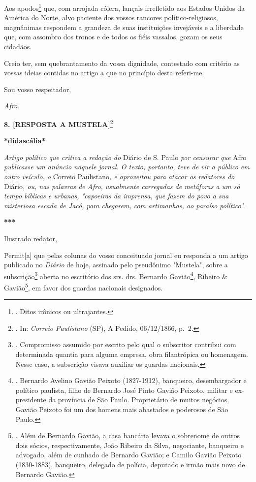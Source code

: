 Aos apodos\footnote{. Ditos irônicos ou ultrajantes.} que, com arrojada
cólera, lançais irrefletido aos Estados Unidos da América do Norte, alvo
paciente dos vossos rancores político-religiosos, magnânimas respondem a
grandeza de suas instituições invejáveis e a liberdade que, com assombro
dos tronos e de todos os fiéis vassalos, gozam os seus cidadãos.

Creio ter, sem quebrantamento da vossa dignidade, contestado com
critério as vossas ideias contidas no artigo a que no princípio desta
referi-me.

Sou vosso respeitador,

\emph{Afro}.

\textbf{8. {[}RESPOSTA A MUSTELA{]}}\footnote{. In: \emph{Correio
  Paulistano} (SP), A Pedido, 06/12/1866, p.~2.}

\textbf{*didascália*}

\emph{Artigo político que critica a redação do} Diário de S. Paulo
\emph{por censurar que} Afro \emph{publicasse um anúncio naquele jornal.
O texto, portanto, teve de vir a público em outro veículo, o} Correio
Paulistano\emph{, e aproveitou para atacar os redatores do}
Diário\emph{, ou, nas palavras de Afro, usualmente carregadas de
metáforas a um só tempo bíblicas e urbanas, "capoeiras da imprensa, que
fazem do povo a sua misteriosa escada de Jacó, para chegarem, com
artimanhas, ao paraíso político".}

\textbf{***}

Ilustrado redator,

Permit{[}a{]} que pelas colunas do vosso conceituado jornal eu responda
a um artigo publicado no \emph{Diário} de hoje, assinado pelo pseudônimo
"Mustela", sobre a subscrição\footnote{. Compromisso assumido por
  escrito pelo qual o subscritor contribui com determinada quantia para
  alguma empresa, obra filantrópica ou homenagem. Nesse caso, a
  subscrição visava auxiliar os guardas nacionais.} aberta no escritório
dos srs. drs. Bernardo Gavião\footnote{. Bernardo Avelino Gavião Peixoto
  (1827-1912), banqueiro, desembargador e político paulista, filho de
  Bernardo José Pinto Gavião Peixoto, militar e ex-presidente da
  província de São Paulo. Proprietário de muitos negócios, Gavião
  Peixoto foi um dos homens mais abastados e poderosos de São Paulo.},
Ribeiro \& Gavião\footnote{. Além de Bernardo Gavião, a casa bancária
  levava o sobrenome de outros dois sócios, respectivamente, João
  Ribeiro da Silva, negociante, banqueiro e advogado, além de cunhado de
  Bernardo Gavião; e Camilo Gavião Peixoto (1830-1883), banqueiro,
  delegado de polícia, deputado e irmão mais novo de Bernardo Gavião.},
em favor dos guardas nacionais designados.

